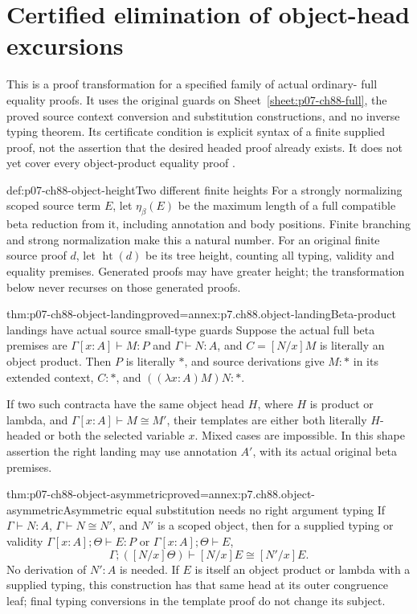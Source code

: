 \section{Certified elimination of object-head excursions}
\label{sec:p07-ch88-object-product}

This is a proof transformation for a specified family of actual ordinary-
full equality proofs. It uses the original guards on
Sheet~\ref{sheet:p07-ch88-full}, the proved source context conversion and
substitution constructions, and no inverse typing theorem. Its certificate
condition is explicit syntax of a finite supplied proof, not the assertion
that the desired headed proof already exists. It does not yet cover every
object-product equality proof \cite[pp.~99--102]{CoquandHuet1988}.

\begin{hbdefinition}{def:p07-ch88-object-height}{Two different finite heights}
For a strongly normalizing scoped source term \(E\), let
\(\eta_\beta(E)\) be the maximum length of a full compatible beta
reduction from it, including annotation and body positions. Finite branching
and strong normalization make this a natural number. For an original
finite source proof \(d\), let \(\operatorname{ht}(d)\) be its tree
height, counting all typing, validity and equality premises. Generated
proofs may have greater height; the transformation below never recurses
on those generated proofs.
\end{hbdefinition}

\begin{hblemma}{thm:p07-ch88-object-landing}{proved=annex:p7.ch88.object-landing}{Beta-product landings have actual source small-type guards}
Suppose the actual full beta premises are
\(\Gamma[x:A]\vdash M:P\) and \(\Gamma\vdash N:A\), and
\(C=[N/x]M\) is literally an object product. Then \(P\) is literally
\(\ast\), and source derivations give \(M:\ast\) in its extended
context, \(C:\ast\), and \(((\lambda x:A)M)N:\ast\).

If two such contracta have the same object head \(H\), where
\(H\) is product or lambda, and
\(\Gamma[x:A]\vdash M\cong M'\), their templates are either
both literally \(H\)-headed or both the selected variable \(x\).
Mixed cases are impossible. In this shape assertion the right landing
may use annotation \(A'\), with its actual original beta premises.
\end{hblemma}

\begin{hbtheorem}{thm:p07-ch88-object-asymmetric}{proved=annex:p7.ch88.object-asymmetric}{Asymmetric equal substitution needs no right argument typing}
If \(\Gamma\vdash N:A\), \(\Gamma\vdash N\cong N'\), and
\(N'\) is a scoped object, then for a supplied typing or validity
\(\Gamma[x:A];\Theta\vdash E:P\) or \(\Gamma[x:A];\Theta\vdash E\),
\[
 \Gamma;([N/x]\Theta)\vdash[N/x]E\cong[N'/x]E.
\]
No derivation of \(N':A\) is needed. If \(E\) is itself an object
product or lambda with a supplied typing, this construction has that
same head at its outer congruence leaf; final typing conversions in the
template proof do not change its subject.
\end{hbtheorem}

